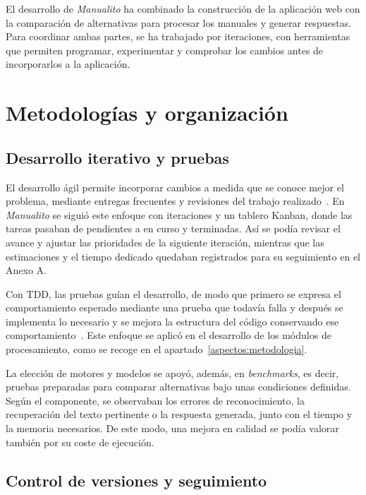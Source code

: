 
El desarrollo de \textit{Manualito} ha combinado la construcción de la
aplicación web con la comparación de alternativas para procesar los manuales
y generar respuestas. Para coordinar ambas partes, se ha trabajado por
iteraciones, con herramientas que permiten programar, experimentar y
comprobar los cambios antes de incorporarlos a la aplicación.

\section{Metodologías y organización}
\label{herramientas:organizacion}

\subsection{Desarrollo iterativo y pruebas}

El desarrollo ágil permite incorporar cambios a medida que se conoce mejor
el problema, mediante entregas frecuentes y revisiones del trabajo
realizado~\cite{principios_agiles}. En \textit{Manualito} se siguió este
enfoque con iteraciones y un tablero Kanban, donde las tareas pasaban de
pendientes a en curso y terminadas. Así se podía revisar el avance y ajustar
las prioridades de la siguiente iteración, mientras que las estimaciones y
el tiempo dedicado quedaban registrados para su seguimiento en el Anexo A.

Con \acs{TDD}, las pruebas guían el desarrollo, de modo que primero se expresa
el comportamiento esperado mediante una prueba que todavía falla y después
se implementa lo necesario y se mejora la estructura del código conservando ese
comportamiento~\cite{agile_alliance_tdd}. Este enfoque se aplicó
en el desarrollo de los módulos de procesamiento, como se recoge en el
apartado~\ref{aspectos:metodologia}.

La elección de motores y modelos se apoyó, además, en \textit{benchmarks},
es decir, pruebas preparadas para comparar alternativas bajo unas condiciones
definidas. Según el componente, se observaban los errores de reconocimiento,
la recuperación del texto pertinente o la respuesta generada, junto con el
tiempo y la memoria necesarios. De este modo, una mejora en calidad se podía
valorar también por su coste de ejecución.

\subsection{Control de versiones y seguimiento}

